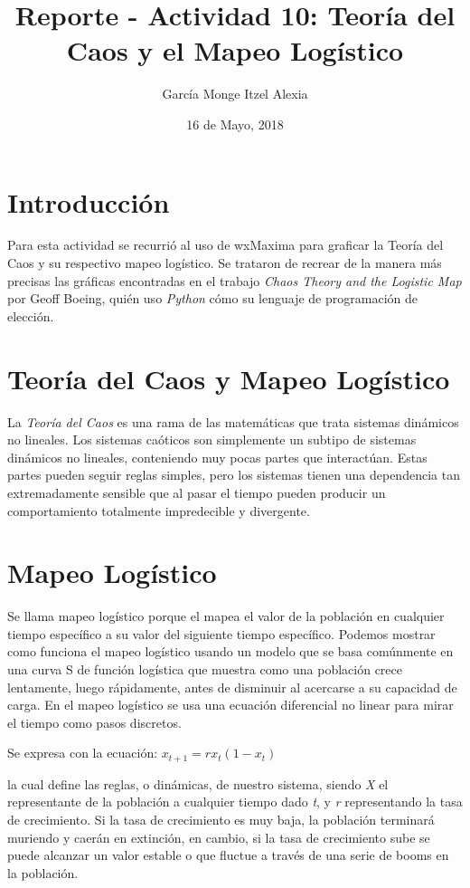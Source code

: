\documentclass{article}
\title{Reporte - Actividad 10: Teoría del Caos y el Mapeo Logístico}
\author{García Monge Itzel Alexia}
\date{16 de Mayo, 2018}
\begin{document}
\maketitle

\section{Introducción}
Para esta actividad se recurrió al uso de wxMaxima para graficar la Teoría del Caos y su respectivo mapeo logístico. Se trataron de recrear de la manera más precisas las gráficas encontradas en el trabajo \textit{Chaos Theory and the Logistic Map} por Geoff Boeing, quién uso \textit{Python} cómo su lenguaje de programación de elección.

\section{Teoría del Caos y Mapeo Logístico}
La \textit{Teoría del Caos} es una rama de las matemáticas que trata sistemas dinámicos no lineales. Los sistemas caóticos son simplemente un subtipo de sistemas dinámicos no lineales, conteniendo muy pocas partes que interactúan. Estas partes pueden seguir reglas simples, pero los sistemas tienen una dependencia tan extremadamente sensible que al pasar el tiempo pueden producir un comportamiento totalmente impredecible y divergente.

\section{Mapeo Logístico}
Se llama mapeo logístico porque el mapea el valor de la población en cualquier tiempo específico a su valor del siguiente tiempo específico. Podemos mostrar como funciona el mapeo logístico usando un modelo que se basa comúnmente en una curva S de función logística que muestra como una población crece lentamente, luego rápidamente, antes de disminuir al acercarse a su capacidad de carga. En el mapeo logístico se usa una ecuación diferencial no linear para mirar el tiempo como pasos discretos.

Se expresa con la ecuación:
$x_{t+1}= rx_t(1-x_t)$

la cual define las reglas, o dinámicas, de nuestro sistema, siendo \textit{X} el representante de la población a cualquier tiempo dado \textit{t}, y \textit{r} representando la tasa de crecimiento. Si la tasa de crecimiento es muy baja, la población terminará muriendo y caerán en extinción, en cambio, si la tasa de crecimiento sube se puede alcanzar un valor estable o que fluctue a través de una serie de booms en la población.
\end{document}
